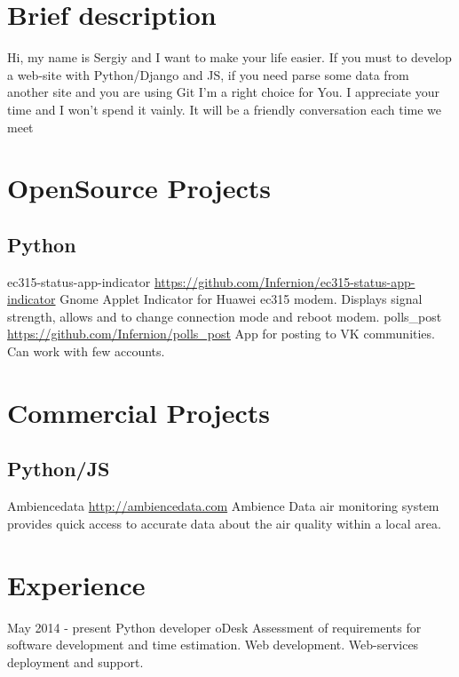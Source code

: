 \documentclass[11pt,a4paper]{moderncv}
\begin{document}
	\maketitle
	
	\section{Brief description}
	\cvline
	{}
	{Hi, my name is Sergiy and I want to make your life easier.\newline{}
	If you must to develop a web-site with Python/Django and JS, if you need parse some data from another site and you are using  Git I'm a right choice for You. \newline{}
	I appreciate your time and I won't spend it vainly.	It will be a friendly conversation each time we meet}
	
	\section{OpenSource Projects}
	\subsection{Python}
	\cvline
	{ec315-status-app-indicator}
	{\url{https://github.com/Infernion/ec315-status-app-indicator}\newline{}
	Gnome Applet Indicator for Huawei ec315 modem. Displays signal strength, allows and to change connection mode and reboot modem.}
	\cvline
	{polls\_post}
	{\url{https://github.com/Infernion/polls_post}\newline{}
	App for posting to VK communities. Can work with few accounts.}
	
	
	\section{Commercial Projects}
	\subsection{Python/JS}
	\cvline
	{Ambiencedata}
	{\url{http://ambiencedata.com}\newline{}
		Ambience Data air monitoring system provides quick access to accurate data about the air quality within a local area.}
	
	\section{Experience}
	\cventry
	{May 2014 - present}
	{Python developer}
	{oDesk}
	{}{}
	{Assessment of requirements for software development and time estimation. 
		\newline{}Web development.
		\newline{}Web-services deployment and support.}
	
\end{document}
